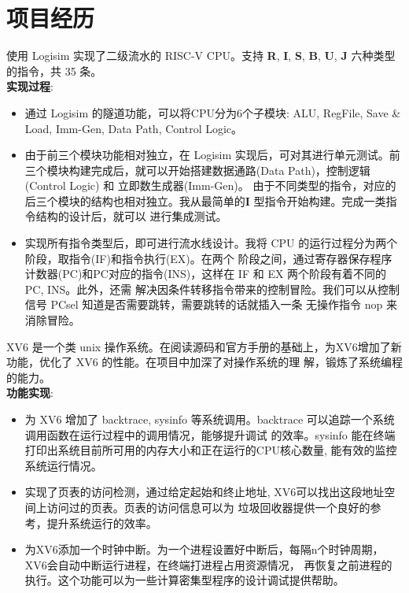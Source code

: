 \documentclass{resume}
\begin{document}
\section{项目经历}
  使用 Logisim 实现了二级流水的 RISC-V CPU。支持 \textbf{R}, \textbf{I}, \textbf{S}, 
    \textbf{B}, \textbf{U}, \textbf{J} 六种类型的指令，共 35 条。 
 \\   \textbf{实现过程}:  
  \begin{itemize}
    \item 通过 Logisim 的隧道功能，可以将CPU分为6个子模块: ALU, RegFile,  
    Save \& Load, Imm-Gen, Data Path, Control Logic。
    \item 由于前三个模块功能相对独立，在 Logisim 实现后，可对其进行单元测试。前三个模块构建完成后，就可以开始搭建数据通路(Data Path)，控制逻辑(Control Logic) 和 立即数生成器(Imm-Gen)。
    由于不同类型的指令，对应的后三个模块的结构也相对独立。我从最简单的\textbf{I} 型指令开始构建。完成一类指令结构的设计后，就可以
    进行集成测试。 
    \item 实现所有指令类型后，即可进行流水线设计。我将 CPU 的运行过程分为两个阶段，取指令(IF)和指令执行(EX)。在两个
    阶段之间，通过寄存器保存程序计数器(PC)和PC对应的指令(INS)，这样在 IF 和 EX 两个阶段有着不同的 PC, INS。此外，还需
    解决因条件转移指令带来的控制冒险。我们可以从控制信号 PCsel 知道是否需要跳转，需要跳转的话就插入一条 无操作指令 nop 来消除冒险。 

\end{itemize}

  XV6 是一个类 unix 操作系统。在阅读源码和官方手册的基础上，为XV6增加了新功能，优化了 XV6 的性能。在项目中加深了对操作系统的理
  解，锻炼了系统编程的能力。
 \\   \textbf{功能实现}:  
\begin{itemize}
 \item 为 XV6 增加了 backtrace, sysinfo 等系统调用。backtrace 可以追踪一个系统调用函数在运行过程中的调用情况，能够提升调试
 的效率。sysinfo 能在终端打印出系统目前所可用的内存大小和正在运行的CPU核心数量, 能有效的监控系统运行情况。
 \item 实现了页表的访问检测，通过给定起始和终止地址, XV6可以找出这段地址空间上访问过的页表。页表的访问信息可以为
 垃圾回收器提供一个良好的参考，提升系统运行的效率。
 \item 为XV6添加一个时钟中断。为一个进程设置好中断后，每隔n个时钟周期，XV6会自动中断运行进程，在终端打进程占用资源情况，
 再恢复之前进程的执行。这个功能可以为一些计算密集型程序的设计调试提供帮助。
\end{itemize}
\end{document}
